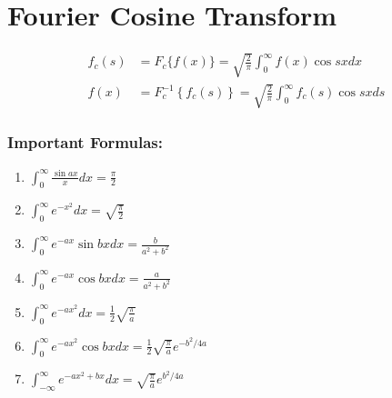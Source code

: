 \section{Fourier Cosine Transform}
\begin{align*}
f_{c}(s)&=F_{c}\{f(x)\}=\sqrt{\frac{2}{\pi}} \int_{0}^{\infty} f(x) \cos s x d x \\
f(x)&=F_{c}^{-1}\left\{f_{c}(s)\right\}=\sqrt{\frac{2}{\pi}} \int_{0}^{\infty} f_{c}(s) \cos s x d s
\end{align*}
\subsubsection{Important Formulas:}
\begin{enumerate}
	\item $\int_{0}^{\infty} \frac{\sin a x}{x} d x=\frac{\pi}{2}$
	\item $\int_{0}^{\infty} e^{-x^{2}} d x=\sqrt{\frac{\pi}{2}}$
	\item $\int_{0}^{\infty} e^{-a x} \sin b x d x=\frac{b}{a^{2}+b^{2}}$
	\item $\int_{0}^{\infty} e^{-a x} \cos b x d x=\frac{a}{a^{2}+b^{2}}$
	\item $\int_{0}^{\infty} e^{-a x^{2}} d x=\frac{1}{2} \sqrt{\frac{\pi}{a}}$
	\item $\int_{0}^{\infty} e^{-a x^{2}} \cos b x d x=\frac{1}{2} \sqrt{\frac{\pi}{a}} e^{-b^{2} / 4 a}$
	\item $\int_{-\infty}^{\infty} e^{-a x^{2}+b x} d x=\sqrt{\frac{\pi}{a}} e^{b^{2} / 4 a}$
\end{enumerate}

